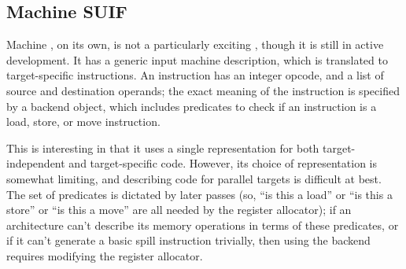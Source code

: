 \documentclass[11pt]{article}
\begin{document}
\subsection{Machine SUIF}

Machine \suif{}\cite{machsuif}, on its own, is not a particularly
exciting \ir, though it is still in active development.  It has a
generic input machine description, which is translated to
target-specific instructions.  An instruction has an integer opcode,
and a list of source and destination operands; the exact meaning of
the instruction is specified by a backend object, which includes
predicates to check if an instruction is a load, store, or move
instruction.

This \ir is interesting in that it uses a single representation for
both target-independent and target-specific code.  However, its choice
of representation is somewhat limiting, and describing code for
parallel targets is difficult at best.  The set of predicates is
dictated by later passes (so, ``is this a load'' or ``is this a
store'' or ``is this a move'' are all needed by the register
allocator); if an architecture can't describe its memory operations in
terms of these predicates, or if it can't generate a basic spill
instruction trivially, then using the backend requires modifying the
register allocator.



\end{document}
